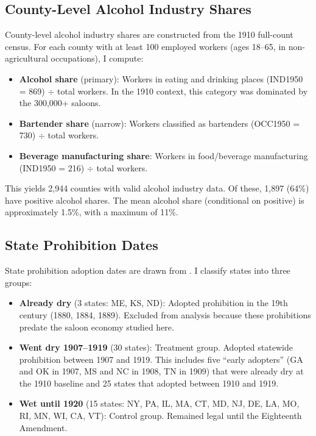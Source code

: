 \documentclass[12pt]{article}
\begin{document}
\subsection{County-Level Alcohol Industry Shares}

County-level alcohol industry shares are constructed from the 1910 full-count census. For each county with at least 100 employed workers (ages 18--65, in non-agricultural occupations), I compute:
\begin{itemize}
    \item \textbf{Alcohol share} (primary): Workers in eating and drinking places (IND1950 = 869) $\div$ total workers. In the 1910 context, this category was dominated by the 300,000+ saloons.
    \item \textbf{Bartender share} (narrow): Workers classified as bartenders (OCC1950 = 730) $\div$ total workers.
    \item \textbf{Beverage manufacturing share}: Workers in food/beverage manufacturing (IND1950 = 216) $\div$ total workers.
\end{itemize}

This yields 2,944 counties with valid alcohol industry data. Of these, 1,897 (64\%) have positive alcohol shares. The mean alcohol share (conditional on positive) is approximately 1.5\%, with a maximum of 11\%.

\subsection{State Prohibition Dates}

State prohibition adoption dates are drawn from \citet{beienburg2020}. I classify states into three groups:
\begin{itemize}
    \item \textbf{Already dry} (3 states: ME, KS, ND): Adopted prohibition in the 19th century (1880, 1884, 1889). Excluded from analysis because these prohibitions predate the saloon economy studied here.
    \item \textbf{Went dry 1907--1919} (30 states): Treatment group. Adopted statewide prohibition between 1907 and 1919. This includes five ``early adopters'' (GA and OK in 1907, MS and NC in 1908, TN in 1909) that were already dry at the 1910 baseline and 25 states that adopted between 1910 and 1919.
    \item \textbf{Wet until 1920} (15 states: NY, PA, IL, MA, CT, MD, NJ, DE, LA, MO, RI, MN, WI, CA, VT): Control group. Remained legal until the Eighteenth Amendment.
\end{itemize}
\end{document}
